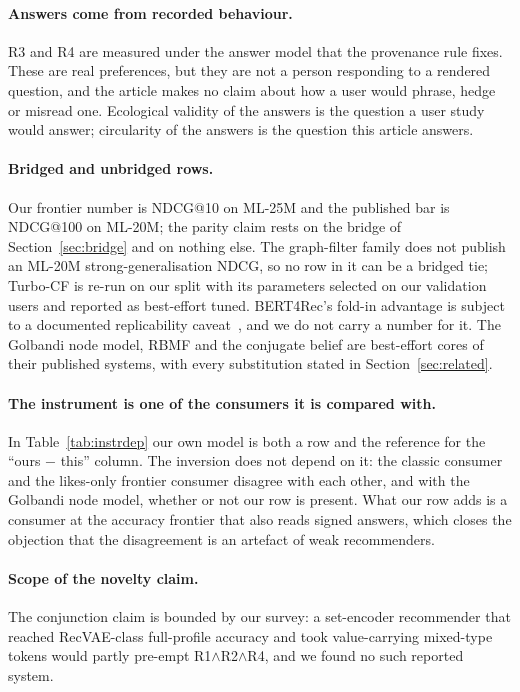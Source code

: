 \documentclass[acmsmall,review,anonymous]{acmart}
\begin{document}
\paragraph{Answers come from recorded behaviour.} R3 and R4 are measured under the answer model that the provenance rule fixes. These are real preferences, but they are not a person responding to a rendered question, and the article makes no claim about how a user would phrase, hedge or misread one. Ecological validity of the answers is the question a user study would answer; circularity of the answers is the question this article answers.

\paragraph{Bridged and unbridged rows.} Our frontier number is NDCG@10 on ML-25M and the published bar is NDCG@100 on ML-20M; the parity claim rests on the bridge of Section~\ref{sec:bridge} and on nothing else. The graph-filter family does not publish an ML-20M strong-generalisation NDCG, so no row in it can be a bridged tie; Turbo-CF is re-run on our split with its parameters selected on our validation users and reported as best-effort tuned. BERT4Rec's fold-in advantage is subject to a documented replicability caveat~\citep{petrov2022replicability}, and we do not carry a number for it. The Golbandi node model, RBMF and the conjugate belief are best-effort cores of their published systems, with every substitution stated in Section~\ref{sec:related}.

\paragraph{The instrument is one of the consumers it is compared with.} In Table~\ref{tab:instrdep} our own model is both a row and the reference for the ``ours $-$ this'' column. The inversion does not depend on it: the classic consumer and the likes-only frontier consumer disagree with each other, and with the Golbandi node model, whether or not our row is present. What our row adds is a consumer at the accuracy frontier that also reads signed answers, which closes the objection that the disagreement is an artefact of weak recommenders.

\paragraph{Scope of the novelty claim.} The conjunction claim is bounded by our survey: a set-encoder recommender that reached RecVAE-class full-profile accuracy and took value-carrying mixed-type tokens would partly pre-empt R1$\wedge$R2$\wedge$R4, and we found no such reported system.
\end{document}
